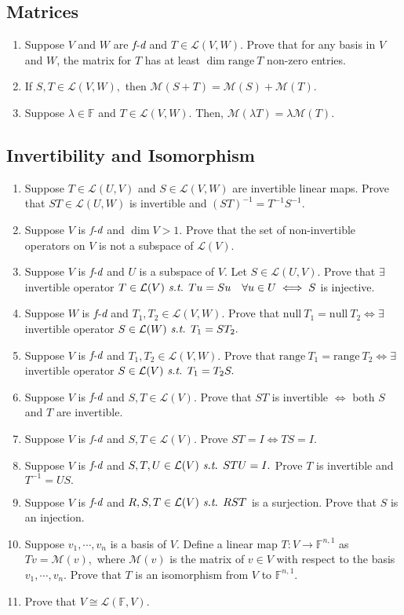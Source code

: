 \documentclass[11pt, letterpaper]{article}
\def\F{\mathbb{F}}
\def\L{\mathcal{L}}
\def\M{\mathcal{M}}
\def\st{\emph{ s.t. }}
\def\FD{\emph{f-d}}
\def\Null{\mathrm{null\ }}
\def\range{\mathrm{range\ }}
\begin{document}
\subsection{Matrices}
\begin{enumerate}
	\item Suppose $V$ and $W$ are $\FD$ and $T\in\L(V,W)$. Prove that for any basis in $V$ and $W$, the matrix for $T$ has at least $\dim\range T$ non-zero entries. 
	\item If $S,T\in\L(V,W),$ then $\M(S+T)=\M(S)+\M(T).$
	\item Suppose $\lambda\in\F$ and $T\in\L(V,W).$ Then, $\M(\lambda T)=\lambda\M(T).$
\end{enumerate}
\subsection{Invertibility and Isomorphism}
\begin{enumerate}
	\item Suppose $T\in\L(U,V)$ and $S\in\L(V,W)$ are invertible linear maps. Prove that $ST\in\L(U,W)$ is invertible and $(ST)^{-1}=T^{-1}S^{-1}.$
	\item Suppose $V$ is $\FD$ and $\dim V>1.$ Prove that the set of non-invertible operators on $V$ is not a subspace of $\L(V).$
	\item Suppose $V$ is $\FD$ and $U$ is a subspace of $V$. Let $S\in\L(U,V).$ Prove that $\exists$ invertible operator $T\in\L(V)\st Tu=Su\quad\forall u\in U\iff S$ is injective. 
	\item Suppose $W$ is $\FD$ and $T_1,T_2\in\L(V,W).$ Prove that $\Null T_1=\Null T_2\iff\exists$ invertible operator $S\in\L(W)\st T_1=ST_2.$
	\item Suppose $V$ is $\FD$ and $T_1,T_2\in\L(V,W).$ Prove that $\range T_1=\range T_2\iff\exists$ invertible operator $S\in\L(V)\st T_1=T_2S.$
	\item Suppose $V$ is $\FD$ and $S,T\in\L(V).$ Prove that $ST$ is invertible $\iff$ both $S$ and $T$ are invertible.
	\item Suppose $V$ is $\FD$ and $S,T\in\L(V).$ Prove $ST=I\iff TS=I.$
	\item Suppose $V$ is $\FD$ and $S,T,U\in\L(V)\st STU=I.$ Prove $T$ is invertible and $T^{-1}=US.$
	\item Suppose $V$ is $\FD$ and $R,S,T\in\L(V)\st RST$ is a surjection. Prove that $S$ is an injection. 
	\item Suppose $v_1,\cdots,v_n$ is a basis of $V$. Define a linear map $T:V\to\F^{n,1}$ as $Tv=\M(v),$ where $\M(v)$ is the matrix of $v\in V$ with respect to the basis $v_1,\cdots,v_n$. Prove that $T$ is an isomorphism from $V$ to $\F^{n,1}.$
	\item Prove that $V\cong\L(\F,V).$
\end{enumerate}
\end{document}
